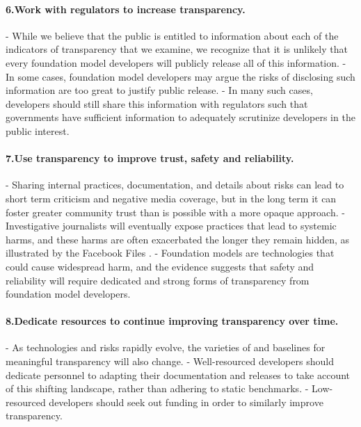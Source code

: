 \documentclass[screen, authorversion, acmsmall]{acmart}
\begin{document}
\paragraph{6.\phantom{X}Work with regulators to increase transparency.} 
-  While we believe that the public is entitled to information about each of the indicators of transparency that we examine, we recognize that it is unlikely that every foundation model developers will publicly release all of this information.
- In some cases, foundation model developers may argue the risks of disclosing such information are too great to justify public release.
- In many such cases, developers should still share this information with regulators such that governments have sufficient information to adequately scrutinize developers in the public interest.
\paragraph{7.\phantom{X}Use transparency to improve trust, safety and reliability.} 
-  Sharing internal practices, documentation, and details about risks can lead to short term criticism and negative media coverage, but in the long term it can foster greater community trust than is possible with a more opaque approach.
- Investigative journalists will eventually expose practices that lead to systemic harms, and these harms are often exacerbated the longer they remain hidden, as illustrated by the Facebook Files \cite{wsj2021fb}.
- Foundation models are technologies that could cause widespread harm, and the evidence suggests that safety and reliability will require dedicated and strong forms of transparency from foundation model developers. \clearpage
\paragraph{8.\phantom{X}Dedicate resources to continue improving transparency over time.} 
-  As technologies and risks rapidly evolve, the varieties of and baselines for meaningful transparency will also change.
- Well-resourced developers should dedicate personnel to adapting their documentation and releases to take account of this shifting landscape, rather than adhering to static benchmarks.
- Low-resourced developers should seek out funding in order to similarly improve transparency.
\end{document}
